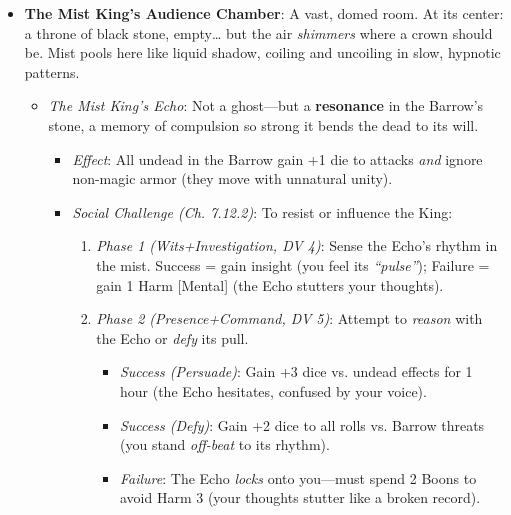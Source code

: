 \documentclass[12pt]{article}
\begin{document}
\begin{itemize}
\begin{itemize}
\begin{itemize}
      \item \textit{Clear 1 Obligation segment}: Act of Service honoring the forgotten (e.g., \textit{I press my forehead to this cold lid and whisper the name I imagine they bore}).
    \end{itemize}
  \end{itemize}
  \item \textbf{The Mist King's Audience Chamber}: A vast, domed room. At its center: a throne of black stone, empty\ldots{} but the air \textit{shimmers} where a crown should be. Mist pools here like liquid shadow, coiling and uncoiling in slow, hypnotic patterns.
  \begin{itemize}
    \item \textit{The Mist King's Echo}: Not a ghost---but a \textbf{resonance} in the Barrow's stone, a memory of compulsion so strong it bends the dead to its will.
    \begin{itemize}
      \item \textit{Effect}: All undead in the Barrow gain +1 die to attacks \textit{and} ignore non-magic armor (they move with unnatural unity).
      \item \textit{Social Challenge (Ch. 7.12.2)}: To resist or influence the King:
      \begin{enumerate}
        \item \textit{Phase 1 (Wits+Investigation, DV 4)}: Sense the Echo's rhythm in the mist. Success = gain insight (you feel its \textit{``pulse''}); Failure = gain 1 Harm [Mental] (the Echo stutters your thoughts).
        \item \textit{Phase 2 (Presence+Command, DV 5)}: Attempt to \textit{reason} with the Echo or \textit{defy} its pull.
        \begin{itemize}
          \item \textit{Success (Persuade)}: Gain +3 dice vs. undead effects for 1 hour (the Echo hesitates, confused by your voice).
          \item \textit{Success (Defy)}: Gain +2 dice to all rolls vs. Barrow threats (you stand \textit{off-beat} to its rhythm).
          \item \textit{Failure}: The Echo \textit{locks} onto you---must spend 2 Boons to avoid Harm 3 (your thoughts stutter like a broken record).
        \end{itemize}
      \end{enumerate}
    \end{itemize}
  \end{itemize}
\end{itemize}
\end{document}
